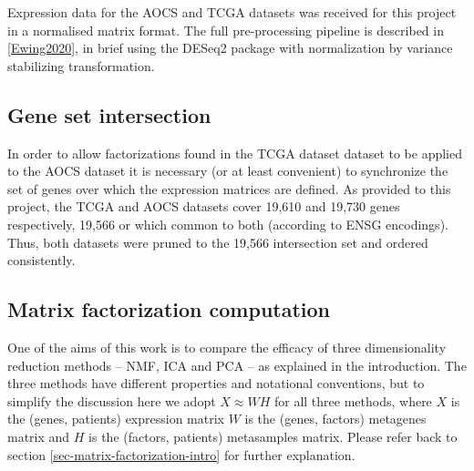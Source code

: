 \documentclass[tikz, 12pt,a4paper,oneside,fleqn]{article}
\begin{document}
Expression data for the AOCS and TCGA datasets was received for this project in a normalised matrix format.  The full pre-processing pipeline is described in \ref{Ewing2020}, in brief using the DESeq2 package with normalization by variance stabilizing transformation.   

\subsection{Gene set intersection}

In order to allow factorizations found in the TCGA dataset dataset to be applied to the AOCS dataset it is necessary (or at least convenient) to synchronize the set of genes over which the expression matrices are defined.   As provided to this project, the TCGA and AOCS datasets cover 19,610 and 19,730 genes respectively, 19,566 or which common to both (according to ENSG encodings).  Thus, both datasets were pruned to the 19,566 intersection set and ordered consistently.

\subsection{Matrix factorization computation}
One of the aims of this work is to compare the efficacy of three dimensionality reduction methods -- NMF, ICA and PCA -- as explained in the introduction.   The three methods have different properties and notational conventions, but to simplify the discussion here we adopt $X \approx W H$ for all three methods, where $X$ is the (genes, patients) expression matrix  $W$ is the (genes, factors) metagenes matrix and $H$ is the (factors, patients) metasamples matrix.   Please refer back to section \ref{sec-matrix-factorization-intro} for further explanation.
\end{document}
